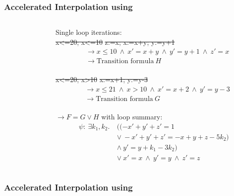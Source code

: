 \begin{frame}[t]
	\frametitle{Accelerated Interpolation using \qvasr}
	\begin{columns}
		\begin{column}{0.3\textwidth}
			\resizebox{0.8\textwidth}{!}{}
		\end{column}
		\begin{column}{0.55\textwidth}
			Single loop iterations: \vspace*{0.25cm}\\
			\st{x<=20; x<=10} \st{z:=x; x:=x+y; y:=y+1}
			\onslide<2->
			{\small 
			\begin{align*}
			&\rightarrow x \leq 10\ \land\ x' = x + y\ \land\ y' = y + 1\ \land\ z' = x \\
			&\rightarrow \text{Transition formula}\ H 
			\end{align*}
			}%
			\onslide<1-> \\
			\vspace*{1cm}\st{x<=20; x>10} \st{x:=x+1; y:=y-3}
			\onslide<2->
			\begin{align*}
			&\rightarrow	x \leq 21\ \land\ x > 10\ \land\ x' = x + 2\ \land\ y' = y -3 \\
			&\rightarrow \text{Transition formula}\ G
			\end{align*}
			\onslide<3-> \\
			\vspace*{0.5cm}
			$\rightarrow F = G \lor H$ \onslide<4-> with loop summary:
			\begin{align*}
				\psi: \	\exists k_1, k_2.\ &((-x' + y' + z' = 1\ \\ & \lor\ -x' + y' + z' = -x + y + z - 5k_2)\ \\ &\land\ y' = y + k_1 - 3k_2)\ \\ &\lor\ x' = x\ \land\ y' = y\ \land\ z' = z
			\end{align*}
		\end{column}
	\end{columns}
\end{frame}

\begin{frame}[t]
	\frametitle{Accelerated Interpolation using \qvasr}
	\begin{columns}
		\begin{column}{0.35\textwidth}
			\resizebox{0.8\textwidth}{!}{}
		\end{column}
		\begin{column}{0.55\textwidth}
			\resizebox{0.77\textwidth}{!}{}
		\end{column}
	\end{columns}
\end{frame}

